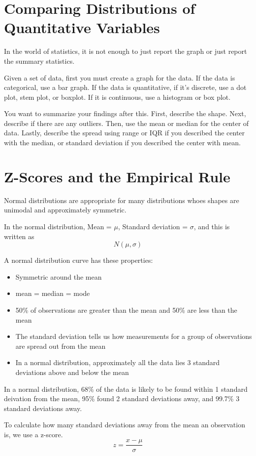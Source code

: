 \documentclass[../stats.tex]{subfiles}
\begin{document}
\section{Comparing Distributions of Quantitative Variables}
In the world of statistics, it is not enough to just report the graph or just report the summary statistics.

Given a set of data, first you must create a graph for the data. If the data is categorical, use a bar graph. 
If the data is quantitative, if it's discrete, use a dot plot, stem plot, or boxplot. If it is continuous, use a histogram or box plot. 

You want to summarize your findings after this. First, describe the shape. Next, describe if there are any outliers. 
Then, use the mean or median for the center of data. Lastly, describe the spread using range or IQR if you described the 
center with the median, or standard deviation if you described the center with mean. 

\section{Z-Scores and the Empirical Rule}
Normal distributions are appropriate for many distributions whoes shapes are unimodal and approximately symmetric.

In the normal distribution, Mean = $\mu$, Standard deviation = $\sigma$, and this is written as 
\[N(\mu,\sigma)\]

A normal distribution curve has these properties:
\begin{itemize}
    \item Symmetric around the mean
    \item mean = median = mode
    \item 50\% of observations are greater than the mean and 50\% are less than the mean
    \item The standard deviation tells us how measurements for a group of observations are spread out from the mean
    \item In a normal distribution, approximately all the data lies 3 standard deviations above and below the mean
\end{itemize}

In a normal distribution, 68\% of the data is likely to be found within 1 standard deivation from the mean, 
95\% found 2 standard deviations away, and 99.7\% 3 standard deviations away.

To calculate how many standard deviations away from the mean an observation is, we use a z-score.
\[z=\frac{x-\mu}{\sigma}\]
\end{document}
